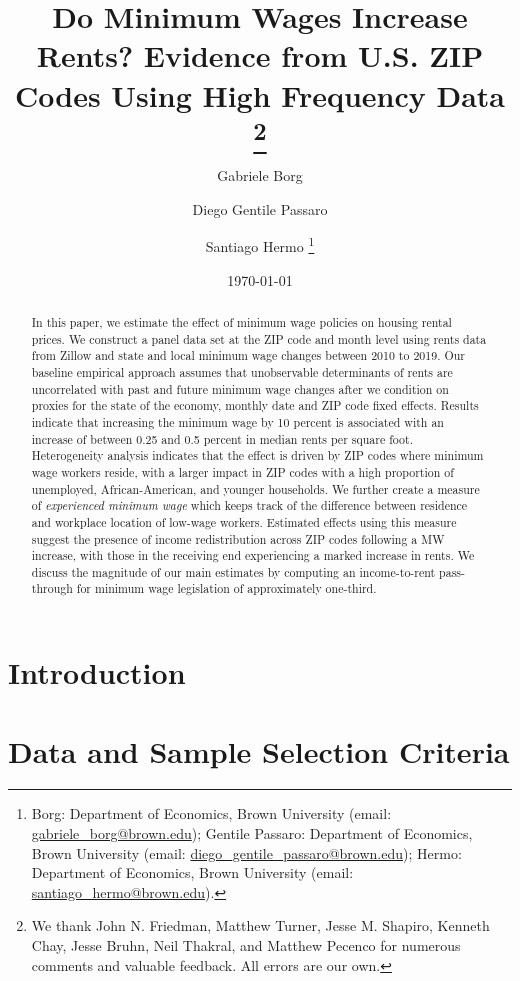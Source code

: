 \documentclass{article}
\title{Do Minimum Wages Increase Rents? 
	   Evidence from U.S. ZIP Codes Using High Frequency Data 
	   \thanks{We thank John N. Friedman, Matthew Turner, Jesse M. Shapiro, 
	   	Kenneth Chay, Jesse Bruhn, Neil Thakral, and Matthew Pecenco for numerous 
	   	comments and valuable feedback. All errors are our own.}}
\author{Gabriele Borg \and Diego Gentile Passaro \and Santiago Hermo
		\footnote{
		Borg: Department of Economics, Brown University 
		(email: \url{gabriele_borg@brown.edu}); 
		Gentile Passaro: Department of Economics, Brown University 
		(email: \url{diego_gentile_passaro@brown.edu}); 
		Hermo: Department of Economics, Brown University 
		(email: \url{santiago_hermo@brown.edu}).}
		}
\date{\today}
\begin{document}
\maketitle

\begin{abstract}
    \noindent
    In this paper, we estimate the effect of minimum wage policies on housing rental 
    prices. We construct a panel data set at the ZIP code and month level using rents 
    data from Zillow and state and local minimum wage changes between 2010 to 2019. 
    Our baseline empirical approach assumes that unobservable determinants of rents 
    are uncorrelated with past and future minimum wage changes after we condition on 
    proxies for the state of the economy, monthly date and ZIP code fixed effects. 
    Results indicate that increasing the minimum wage by 10 percent is associated with 
    an increase of between 0.25 and 0.5 percent in median rents per square foot. 
    Heterogeneity analysis indicates that the effect is driven by ZIP codes where minimum 
    wage workers reside, with a larger impact in ZIP codes with a high proportion of 
    unemployed, African-American, and younger households. 
    We further create a measure of \textit{experienced minimum wage} which keeps track 
    of the difference between residence and workplace location of low-wage workers. 
    Estimated effects using this measure suggest the presence of income redistribution 
    across ZIP codes following a MW increase, with those in the receiving end 
    experiencing a marked increase in rents. 
    We discuss the magnitude of our main estimates by computing an income-to-rent 
    pass-through for minimum wage legislation of approximately one-third.
\end{abstract}

\vspace{5mm}

\maketitle


\clearpage

\section{Introduction}\label{sec:intro}
    

\section{Data and Sample Selection Criteria}\label{sec:data}
	
\end{document}
